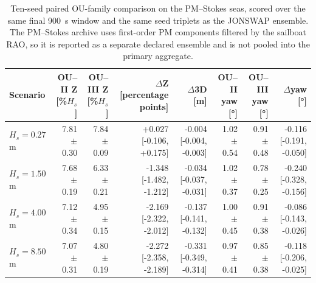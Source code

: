 \begin{table}[t]
  \centering
  \caption{Ten-seed paired OU-family comparison on the PM--Stokes seas, scored over the same final \SI{900}{s} window and the same seed triplets as the JONSWAP ensemble. The PM--Stokes archive uses first-order PM components filtered by the sailboat RAO, so it is reported as a separate declared ensemble and is not pooled into the primary aggregate.}
  \label{tab:ou_mc_pmstokes}
  \footnotesize
  \setlength{\tabcolsep}{4.0pt}
  \begin{tabular}{@{}lrrrrrrr@{}}
    \toprule
    Scenario & OU--II Z [\%$H_s$] & OU--III Z [\%$H_s$] & $\Delta$Z [percentage points] & $\Delta$3D [m] & OU--II yaw [\si{\degree}] & OU--III yaw [\si{\degree}] & $\Delta$yaw [\si{\degree}] \\
    \midrule
    $H_s=0.27$ m & 7.81 $\pm$ 0.30 & 7.84 $\pm$ 0.09 & +0.027 [-0.106, +0.175] & -0.004 [-0.004, -0.003] & 1.02 $\pm$ 0.54 & 0.91 $\pm$ 0.48 & -0.116 [-0.191, -0.050] \\
    $H_s=1.50$ m & 7.68 $\pm$ 0.19 & 6.33 $\pm$ 0.21 & -1.348 [-1.482, -1.212] & -0.034 [-0.037, -0.031] & 1.02 $\pm$ 0.37 & 0.78 $\pm$ 0.25 & -0.240 [-0.328, -0.156] \\
    $H_s=4.00$ m & 7.12 $\pm$ 0.34 & 4.95 $\pm$ 0.15 & -2.169 [-2.322, -2.012] & -0.137 [-0.141, -0.132] & 1.00 $\pm$ 0.45 & 0.91 $\pm$ 0.38 & -0.086 [-0.143, -0.026] \\
    $H_s=8.50$ m & 7.07 $\pm$ 0.31 & 4.80 $\pm$ 0.19 & -2.272 [-2.358, -2.189] & -0.331 [-0.349, -0.314] & 0.97 $\pm$ 0.41 & 0.85 $\pm$ 0.38 & -0.118 [-0.206, -0.025] \\
    \bottomrule
  \end{tabular}
\end{table}


